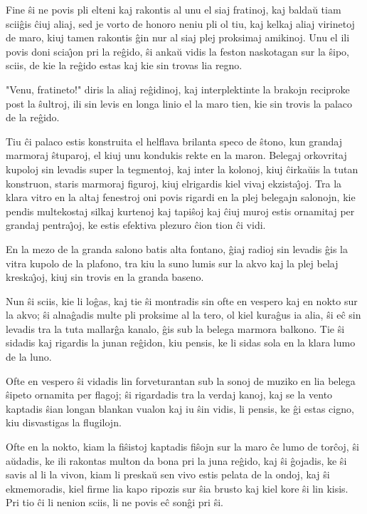    Fine \^si ne povis pli elteni kaj rakontis al unu el siaj fratinoj,
kaj balda\u u tiam scii\^gis \^ciuj aliaj, sed je vorto de honoro
neniu pli ol tiu, kaj kelkaj aliaj virinetoj de maro, kiuj tamen
rakontis \^gin nur al siaj plej proksimaj amikinoj. Unu el ili povis
doni scia\^{\j}on pri la re\^gido, \^si anka\u u vidis la feston
naskotagan sur la \^sipo, sciis, de kie la re\^gido estas kaj kie
sin trovas lia regno.

   "Venu, fratineto!" diris la aliaj re\^gidinoj, kaj interplektinte la
brakojn reciproke post la \^sultroj, ili sin levis en longa linio el
la maro tien, kie sin trovis la palaco de la re\^gido.

   Tiu \^ci palaco estis konstruita el helflava brilanta speco de \^stono,
kun grandaj marmoraj \^stuparoj, el kiuj unu kondukis rekte en la
maron. Belegaj orkovritaj kupoloj sin levadis super la tegmentoj,
kaj inter la kolonoj, kiuj \^cirka\u uis la tutan konstruon, staris
marmoraj figuroj, kiuj elrigardis kiel vivaj ekzista\^{\j}oj. Tra la
klara vitro en la altaj fenestroj oni povis rigardi en la plej
belegajn salonojn, kie pendis multekostaj silkaj kurtenoj kaj
tapi\^soj kaj \^ciuj muroj estis ornamitaj per grandaj
pentra\^{\j}oj, ke estis efektiva plezuro \^cion tion \^ci vidi.

   En la mezo de la granda salono batis alta fontano, \^giaj radioj sin
levadis \^gis la vitra kupolo de la plafono, tra kiu la suno lumis
sur la akvo kaj la plej belaj kreska\^{\j}oj, kiuj sin trovis en la
granda baseno.

   Nun \^si sciis, kie li lo\^gas, kaj tie \^si montradis sin ofte en
vespero kaj en nokto sur la akvo; \^si alna\^gadis multe pli
proksime al la tero, ol kiel kura\^gus ia alia, \^si e\^c sin
levadis tra la tuta mallar\^ga kanalo, \^gis sub la belega marmora
balkono. Tie \^si sidadis kaj rigardis la junan re\^gidon, kiu
pensis, ke li sidas sola en la klara lumo de la luno.

   Ofte en vespero \^si vidadis lin forveturantan sub la sonoj de muziko
en lia belega \^sipeto ornamita per flagoj; \^si rigardadis tra la
verdaj kanoj, kaj se la vento kaptadis \^sian longan blankan vualon
kaj iu \^sin vidis, li pensis, ke \^gi estas cigno, kiu disvastigas
la flugilojn.

   Ofte en la nokto, kiam la fi\^sistoj kaptadis fi\^sojn sur la maro \^ce
lumo de tor\^coj, \^si a\u udadis, ke ili rakontas multon da bona
pri la juna re\^gido, kaj \^si \^gojadis, ke \^si savis al li la
vivon, kiam li preska\u u sen vivo estis pelata de la ondoj, kaj
\^si ekmemoradis, kiel firme lia kapo ripozis sur \^sia brusto kaj
kiel kore \^si lin kisis. Pri tio \^ci li nenion sciis, li ne povis
e\^c son\^gi pri \^si.

